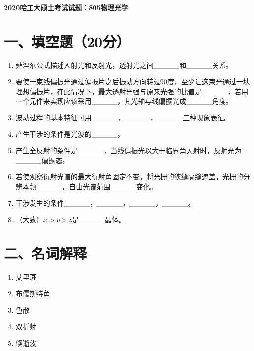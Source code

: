 \documentclass[12pt, a4paper]{article}
\theoremstyle{solution}
\begin{document}
\begin{center}
\Large\textbf{2020哈工大硕士考试试题：805物理光学}
\end{center}





\section*{一、填空题（20分）}
\begin{enumerate}
    \item 菲涅尔公式描述入射光和反射光，透射光之间\_\_\_\_\_和\_\_\_\_\_关系。
    \item 要使一束线偏振光通过偏振片之后振动方向转过90度，至少让这束光通过一块理想偏振片，在此情况下，最大透射光强与原来光强的比值是\_\_\_\_\_，若用一个元件来实现应该采用\_\_\_\_\_，其光轴与线偏振光成\_\_\_\_\_角度。
    \item 波动过程的基本特征可用\_\_\_\_\_，\_\_\_\_\_，\_\_\_\_\_三种现象表征。
    \item 产生干涉的条件是光波的\_\_\_\_\_。
    \item 产生全反射的条件是\_\_\_\_\_，当线偏振光以大于临界角入射时，反射光为\_\_\_\_\_偏振态。
    \item 若使观察衍射光谱的最大衍射角固定不变，将光栅的狭缝隔缝遮盖，光栅的分辨本领\_\_\_\_\_，自由光谱范围\_\_\_\_\_变化。
    \item 干涉发生的条件\_\_\_\_\_，\_\_\_\_\_，\_\_\_\_\_，\_\_\_\_\_。
    \item （大致）$x>y>z$是\_\_\_\_\_晶体。
\end{enumerate}
\section*{二、名词解释}
\begin{enumerate}
    \item 艾里斑
    \item 布儒斯特角
    \item 色散
    \item 双折射
    \item 倏逝波
\end{enumerate}
\end{document}
